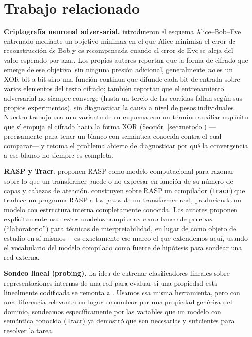 \documentclass[manuscript,screen]{acmart}
\begin{document}
\section{Trabajo relacionado}

\textbf{Criptografía neuronal adversarial.} \citet{abadi2016learning} introdujeron el esquema
Alice--Bob--Eve entrenado mediante un objetivo minimax en el que Alice minimiza el error de
reconstrucción de Bob y es recompensada cuando el error de Eve se aleja del valor esperado por
azar. Los propios autores reportan que la forma de cifrado que emerge de ese objetivo, sin
ninguna presión adicional, generalmente \emph{no} es un XOR bit a bit sino una función continua
que difunde cada bit de entrada sobre varios elementos del texto cifrado; también reportan que el
entrenamiento adversarial no siempre converge (hasta un tercio de las corridas fallan según sus
propios experimentos), sin diagnosticar la causa a nivel de pesos individuales. Nuestro trabajo
usa una variante de su esquema con un término auxiliar explícito que sí empuja el cifrado hacia
la forma XOR (Sección~\ref{sec:metodo}) —precisamente para tener un blanco con semántica
conocida contra el cual comparar— y retoma el problema abierto de diagnosticar por qué la
convergencia a ese blanco no siempre es completa.

\textbf{RASP y Tracr.} \citet{weiss2021thinking} proponen RASP como modelo computacional para
razonar sobre lo que un transformer puede o no expresar en función de su número de capas y
cabezas de atención. \citet{lindner2023tracr} construyen sobre RASP un compilador
(\texttt{tracr}) que traduce un programa RASP a los pesos de un transformer real, produciendo
un modelo con estructura interna completamente conocida. Los autores proponen explícitamente
usar estos modelos compilados como banco de pruebas (``laboratorio'') para técnicas de
interpretabilidad, en lugar de como objeto de estudio en sí mismos —es exactamente ese marco el
que extendemos aquí, usando el vocabulario del modelo compilado como fuente de hipótesis para
sondear una red externa.

\textbf{Sondeo lineal (probing).} La idea de entrenar clasificadores lineales sobre
representaciones internas de una red para evaluar si una propiedad está linealmente codificada
se remonta a \citet{alain2016understanding}. Usamos esa misma herramienta, pero con una
diferencia relevante: en lugar de sondear por una propiedad genérica del dominio, sondeamos
específicamente por las variables que un modelo con semántica conocida (Tracr) ya demostró que
son necesarias y suficientes para resolver la tarea.
\end{document}
